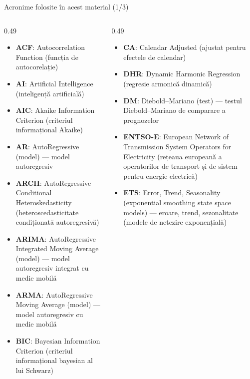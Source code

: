 
{
\begin{frame}[noframenumbering]
    \titlepage
\end{frame}
}
\begin{frame}{Acronime folosite în acest material (1/3)}
\begin{columns}[T]
\begin{column}{0.49\textwidth}
\begin{itemize}\setlength{\itemsep}{0pt}
    \item \textbf{ACF}: Autocorrelation Function (funcția de autocorelație)
    \item \textbf{AI}: Artificial Intelligence (inteligență artificială)
    \item \textbf{AIC}: Akaike Information Criterion (criteriul informațional Akaike)
    \item \textbf{AR}: AutoRegressive (model) — model autoregresiv
    \item \textbf{ARCH}: AutoRegressive Conditional Heteroskedasticity (heteroscedasticitate condiționată autoregresivă)
    \item \textbf{ARIMA}: AutoRegressive Integrated Moving Average (model) — model autoregresiv integrat cu medie mobilă
    \item \textbf{ARMA}: AutoRegressive Moving Average (model) — model autoregresiv cu medie mobilă
    \item \textbf{BIC}: Bayesian Information Criterion (criteriul informațional bayesian al lui Schwarz)
\end{itemize}
\end{column}
\begin{column}{0.49\textwidth}
\begin{itemize}\setlength{\itemsep}{0pt}
    \item \textbf{CA}: Calendar Adjusted (ajustat pentru efectele de calendar)
    \item \textbf{DHR}: Dynamic Harmonic Regression (regresie armonică dinamică)
    \item \textbf{DM}: Diebold–Mariano (test) — testul Diebold–Mariano de comparare a prognozelor
    \item \textbf{ENTSO-E}: European Network of Transmission System Operators for Electricity (rețeaua europeană a operatorilor de transport și de sistem pentru energie electrică)
    \item \textbf{ETS}: Error, Trend, Seasonality (exponential smoothing state space models) — eroare, trend, sezonalitate (modele de netezire exponențială)
\end{itemize}
\end{column}
\end{columns}
\end{frame}
